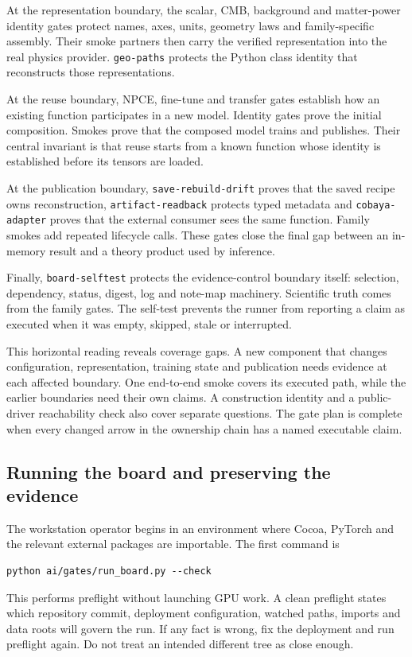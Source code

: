 \documentclass[10pt,aps,prd,twocolumn,nofootinbib]{revtex4-2}
\newcommand{\code}[1]{\texttt{#1}}
\begin{document}
At the representation boundary, the scalar, CMB, background and matter-power
identity gates protect names, axes, units, geometry laws and family-specific
assembly.  Their smoke partners then carry the verified representation into
the real physics provider.  \code{geo-paths} protects the Python class identity
that reconstructs those representations.

At the reuse boundary, NPCE, fine-tune and transfer gates establish how an
existing function participates in a new model.  Identity gates prove the
initial composition.  Smokes prove that the composed model trains and
publishes.  Their central invariant is that reuse starts from a known function
whose identity is established before its tensors are loaded.

At the publication boundary, \code{save-rebuild-drift} proves that the saved
recipe owns reconstruction, \code{artifact-readback} protects typed metadata
and \code{cobaya-adapter} proves that the external consumer sees the same
function.  Family smokes add repeated
lifecycle calls.  These gates close the final gap between an in-memory result
and a theory product used by inference.

Finally, \code{board-selftest} protects the evidence-control boundary itself:
selection, dependency, status, digest, log and note-map machinery.  Scientific
truth comes from the family gates.  The self-test prevents the runner from
reporting a claim as executed when it was empty, skipped, stale or interrupted.

This horizontal reading reveals coverage gaps.  A new component that changes
configuration, representation, training state and publication needs evidence
at each affected boundary.  One end-to-end smoke covers its executed path,
while the earlier boundaries need their own claims.  A construction identity
and a public-driver reachability check also cover separate questions.  The
gate plan is complete when every changed arrow in the ownership chain has a
named executable claim.

\subsection{Running the board and preserving the evidence}

The workstation operator begins in an environment where Cocoa, PyTorch and
the relevant external packages are importable.  The first command is
\begin{verbatim}
python ai/gates/run_board.py --check
\end{verbatim}
This performs preflight without launching GPU work.  A clean preflight states
which repository commit, deployment configuration, watched paths, imports and
data roots will govern the run.  If any fact is wrong, fix the deployment and
run preflight again.  Do not treat an intended different tree as close enough.
\end{document}
